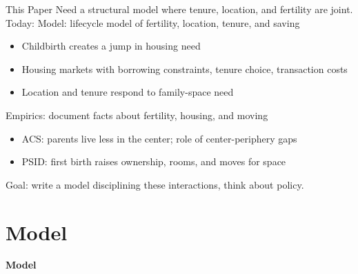 \documentclass[11pt,aspectratio=169]{beamer}
\begin{document}
\begin{frame}{This Paper}
Need a structural model where tenure, location, and fertility are joint.
Today:
\vfill
\alert{Model:} lifecycle model of fertility, location, tenure, and saving
\begin{itemize}
  \vfill \item Childbirth creates a jump in housing need
  \vfill \item Housing markets with borrowing constraints, tenure choice, transaction costs
  \vfill \item Location and tenure respond to family-space need
\end{itemize}

\vfill
\alert{Empirics:} document facts about fertility, housing, and moving
\begin{itemize}
  \vfill \item ACS: parents live less in the center; role of center-periphery gaps
  \vfill \item PSID: first birth raises ownership, rooms, and moves for space
\end{itemize}

\vfill
\alert{Goal:} write a model disciplining these interactions, think about policy.
\end{frame}

\section{Model}

\begin{frame}
\centering
{\Large\textbf{Model}}
\end{frame}
\end{document}
